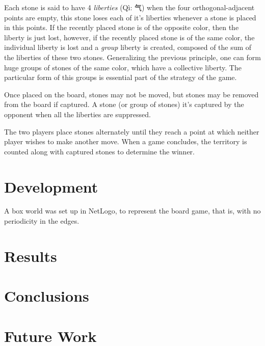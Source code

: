 \documentclass[a4paper,10pt,twocolumn]{article}
\begin{document}
\begin{CJK*}{UTF8}{gbsn}
Each stone is said to have 4 \emph{liberties} ({Qì:  气})  when the four orthogonal-adjacent points are empty, this stone loses each of it's liberties whenever a stone is placed in this points. If the recently placed stone is of the opposite color, then the liberty is just lost, however, if the recently placed stone is of the same color, the individual liberty is lost and a \emph{group} liberty is created, composed of the sum of the liberties of these two stones. Generalizing the previous principle, one can form huge groups of stones of the same color, which have a collective liberty. The particular form of this groups is essential part of the strategy of the game. 

Once placed on the board, stones may not be moved, but stones may be removed from the board if captured. A stone (or group of stones) it's captured by the opponent when all the liberties are suppressed.

The two players place stones alternately until they reach a point at which neither player wishes to make another move. When a game concludes, the territory is counted along with captured stones to determine the winner. 



\section{Development}
A box world was set up in NetLogo, to represent the board game, that is, with no periodicity in the edges.  

\section{Results}

\section{Conclusions}

\section{Future Work}





\end{CJK*}
\end{document}
